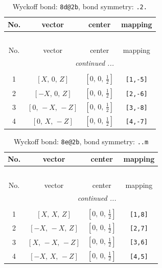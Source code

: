 \documentclass[fleqn,8pt]{jsarticle}
\begin{document}
\begin{longtable}{cccc}
\caption{Wyckoff bond: {\tt 8d@2b}, bond symmetry: {\tt .2.}}
 \\
 \hline \hline
No. & vector & center & mapping \\ \hline \endfirsthead

\multicolumn{3}{l}{\tablename\ \thetable{}} \\
 \hline \hline
No. & vector & center & mapping \\ \hline \endhead

 \hline \hline
\multicolumn{3}{r}{\footnotesize\it continued ...} \\ \endfoot

 \hline \hline
\multicolumn{3}{r}{} \\ \endlastfoot

1 & $\left[ X,\, 0,\, Z \right]$ & $\left[ 0,\, 0,\, \frac{1}{2} \right]$ & {\tt [1,-5]} \\ \hline
2 & $\left[ - X,\, 0,\, Z \right]$ & $\left[ 0,\, 0,\, \frac{1}{2} \right]$ & {\tt [2,-6]} \\ \hline
3 & $\left[ 0,\, - X,\, - Z \right]$ & $\left[ 0,\, 0,\, \frac{1}{2} \right]$ & {\tt [3,-8]} \\ \hline
4 & $\left[ 0,\, X,\, - Z \right]$ & $\left[ 0,\, 0,\, \frac{1}{2} \right]$ & {\tt [4,-7]} \\
\end{longtable}
\renewcommand{\arraystretch}{1.2}
\begin{longtable}{cccc}
\caption{Wyckoff bond: {\tt 8e@2b}, bond symmetry: {\tt ..m}}
 \\
 \hline \hline
No. & vector & center & mapping \\ \hline \endfirsthead

\multicolumn{3}{l}{\tablename\ \thetable{}} \\
 \hline \hline
No. & vector & center & mapping \\ \hline \endhead

 \hline \hline
\multicolumn{3}{r}{\footnotesize\it continued ...} \\ \endfoot

 \hline \hline
\multicolumn{3}{r}{} \\ \endlastfoot

1 & $\left[ X,\, X,\, Z \right]$ & $\left[ 0,\, 0,\, \frac{1}{2} \right]$ & {\tt [1,8]} \\ \hline
2 & $\left[ - X,\, - X,\, Z \right]$ & $\left[ 0,\, 0,\, \frac{1}{2} \right]$ & {\tt [2,7]} \\ \hline
3 & $\left[ X,\, - X,\, - Z \right]$ & $\left[ 0,\, 0,\, \frac{1}{2} \right]$ & {\tt [3,6]} \\ \hline
4 & $\left[ - X,\, X,\, - Z \right]$ & $\left[ 0,\, 0,\, \frac{1}{2} \right]$ & {\tt [4,5]} \\
\end{longtable}
\end{document}
